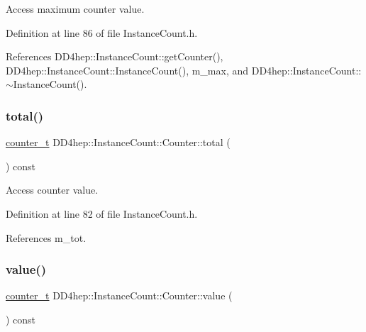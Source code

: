 Access maximum counter value. 



Definition at line 86 of file Instance\+Count.\+h.



References D\+D4hep\+::\+Instance\+Count\+::get\+Counter(), D\+D4hep\+::\+Instance\+Count\+::\+Instance\+Count(), m\+\_\+max, and D\+D4hep\+::\+Instance\+Count\+::$\sim$\+Instance\+Count().

\hypertarget{class_d_d4hep_1_1_instance_count_1_1_counter_a147f1ee4ebf0b23bf603367032f662c7}{}\label{class_d_d4hep_1_1_instance_count_1_1_counter_a147f1ee4ebf0b23bf603367032f662c7} 
\subsubsection{\texorpdfstring{total()}{total()}}
{\footnotesize\ttfamily \hyperlink{struct_d_d4hep_1_1_instance_count_ae81dc0c76b135425e14b6dc38262a727}{counter\+\_\+t} D\+D4hep\+::\+Instance\+Count\+::\+Counter\+::total (\begin{DoxyParamCaption}{ }\end{DoxyParamCaption}) const\hspace{0.3cm}{\ttfamily [inline]}}



Access counter value. 



Definition at line 82 of file Instance\+Count.\+h.



References m\+\_\+tot.

\hypertarget{class_d_d4hep_1_1_instance_count_1_1_counter_a3ed75b4aa541d4467fc9ae5109d67476}{}\label{class_d_d4hep_1_1_instance_count_1_1_counter_a3ed75b4aa541d4467fc9ae5109d67476} 
\subsubsection{\texorpdfstring{value()}{value()}}
{\footnotesize\ttfamily \hyperlink{struct_d_d4hep_1_1_instance_count_ae81dc0c76b135425e14b6dc38262a727}{counter\+\_\+t} D\+D4hep\+::\+Instance\+Count\+::\+Counter\+::value (\begin{DoxyParamCaption}{ }\end{DoxyParamCaption}) const\hspace{0.3cm}{\ttfamily [inline]}}



